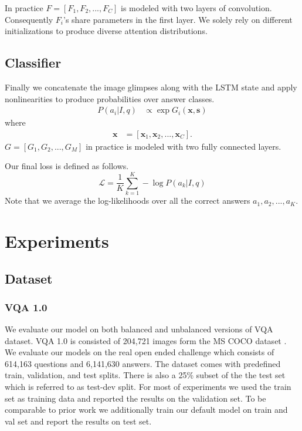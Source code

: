 \documentclass[10pt,twocolumn,letterpaper]{article}
\begin{document}
In practice $F = [F_1, F_2, ..., F_C]$ is modeled with two layers of convolution. Consequently $F_i$'s share parameters in the first layer.
We solely rely on different initializations to produce diverse attention distributions. 

\subsection{Classifier}
Finally we concatenate the image glimpses along with the LSTM state and apply nonlinearities to produce probabilities over answer classes.
\begin{align}
P(a_i|I, q) &\propto \exp G_i(\mathbf{x}, \mathbf{s})
\end{align}
where 
\begin{align}
\mathbf{x} &= [\mathbf{x}_1, \mathbf{x}_2, ..., \mathbf{x}_C].
\end{align}
$G = [G_1, G_2, ..., G_M]$ in practice is modeled with two fully connected layers.

Our final loss is defined as follows.
\begin{equation}
\mathcal{L} = \frac{1}{K}\sum_{k=1}^K - \log P(a_k|I, q)
\end{equation}
Note that we average the log-likelihoods over all the correct answers $a_1, a_2, ..., a_K$.

\section{Experiments}
\subsection{Dataset}
\subsubsection{VQA 1.0}
We evaluate our model on both balanced and unbalanced versions of VQA dataset.
VQA 1.0 \cite{Antol2015VQAVQ} is consisted of 204,721 images form the MS COCO dataset \cite{Lin2014MicrosoftCC}.
We evaluate our models on the real open ended challenge which consists of  614,163 questions and 6,141,630 answers. The dataset comes with predefined train, validation, and test splits. There is also a 25\% subset of the the test set which is referred to as test-dev split. For most of experiments we used the train set as training data and reported the results on the validation set. To be comparable to prior work we additionally train our default model on train and val set and report the results on test set.
\end{document}
